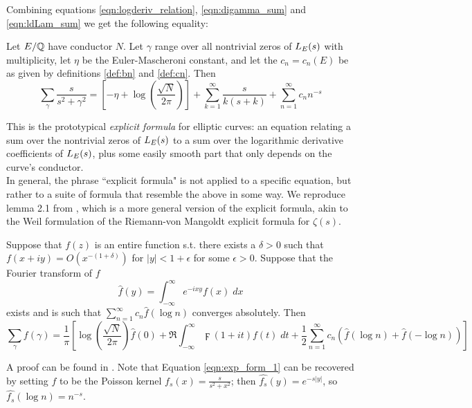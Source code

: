 Combining equations \ref{eqn:logderiv_relation}, \ref{eqn:digamma_sum} and \ref{eqn:ldLam_sum} we get the following equality:
\begin{proposition}
Let $E/\mathbb{Q}$ have conductor $N$. Let $\gamma$ range over all nontrivial zeros of $L_E(s)$ with multiplicity, let $\eta$ be the Euler-Mascheroni constant, and let the $c_n = c_n(E)$ be as given by definitions \ref{def:bn} and \ref{def:cn}. Then
\begin{equation}\label{eqn:exp_form_1}
\sum_{\gamma} \frac{s}{s^2 + \gamma^2} = \left[-\eta + \log\left(\frac{\sqrt{N}}{2\pi}\right)\right] + \sum_{k=1}^{\infty} \frac{s}{k(s+k)} + \sum_{n=1}^{\infty} c_n n^{-s}
\end{equation}
\end{proposition}
This is the prototypical {\it explicit formula} for elliptic curves: an equation relating a sum over the nontrivial zeros of $L_E(s)$ to a sum over the logarithmic derivative coefficients of $L_E(s)$, plus some easily smooth part that only depends on the curve's conductor. \\

In general, the phrase ``explicit formula" is not applied to a specific equation, but rather to a suite of formula that resemble the above in some way. We reproduce lemma 2.1 from \cite{Bob-2011}, which is a more general version of the explicit formula, akin to the Weil formulation of the Riemann-von Mangoldt explicit formula for $\zeta(s)$.
\begin{lemma}\label{lem:exp_form_2}
Suppose that $f(z)$ is an entire function s.t. there exists a $\delta>0$ such that $f(x+iy) = O(x^{-(1+\delta)})$ for $|y|<1+\epsilon$ for some $\epsilon>0$. Suppose that the Fourier transform of $f$
\begin{equation}
\hat{f}(y) = \int_{-\infty}^{\infty} e^{-i x y}f(x)\; dx
\end{equation}
exists and is such that $\sum_{n=1}^{\infty} c_n \hat{f}\left(\log n\right)$ converges absolutely. Then
\begin{equation}\label{eqn:exp_form_2}
\sum_{\gamma} f(\gamma) = \frac{1}{\pi}\left[\log\left(\frac{\sqrt{N}}{2\pi}\right)\hat{f}(0) + \Re\int_{-\infty}^{\infty} \digamma(1+it)f(t) \; dt  + \frac{1}{2} \sum_{n=1}^{\infty} c_n \left( \hat{f}\left(\log n\right) + \hat{f}\left(-\log n\right)\right) \right]
\end{equation}
\end{lemma}
A proof can be found in \cite[Theorem 5.12]{IwKo-2004}. Note that Equation \ref{eqn:exp_form_1} can be recovered by setting $f$ to be the Poisson kernel $f_s(x) = \frac{s}{s^2+x^2}$; then $\hat{f_s}(y) = e^{-s|y|}$, so $\hat{f_s}(\log n) = n^{-s}$. \\

